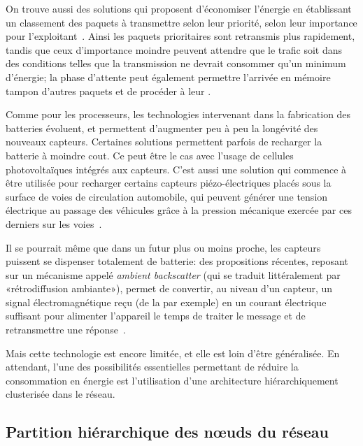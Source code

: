 On trouve aussi des solutions qui proposent d'économiser l'énergie en établissant un classement des paquets à transmettre selon leur priorité, \cad selon leur importance pour l'exploitant~\cite{SAS14}.
Ainsi les paquets prioritaires sont retransmis plus rapidement, tandis que ceux d'importance moindre peuvent attendre que le trafic soit dans des conditions telles que la transmission ne devrait consommer qu'un minimum d'énergie; la phase d'attente peut également permettre l'arrivée en mémoire tampon d'autres paquets et de procéder à leur .

Comme pour les processeurs, les technologies intervenant dans la fabrication des batteries évoluent, et permettent d'augmenter peu à peu la longévité des nouveaux capteurs.
Certaines solutions permettent parfois de recharger la batterie à moindre cout.
Ce peut être le cas avec l'usage de cellules photovoltaïques intégrés aux capteurs.
C'est aussi une solution qui commence à être utilisée pour recharger certains capteurs piézo-électriques placés sous la surface de voies de circulation automobile, qui peuvent générer une tension électrique au passage des véhicules grâce à la pression mécanique exercée par ces derniers sur les voies~\cite{sti}.

Il se pourrait même que dans un futur plus ou moins proche, les capteurs puissent se dispenser totalement de batterie: des propositions récentes, reposant sur un mécanisme appelé \textit{ambient backscatter} (qui se traduit littéralement par «rétrodiffusion ambiante»), permet de convertir, au niveau d'un capteur, un signal électromagnétique reçu (de la \sdb par exemple) en un courant électrique suffisant pour alimenter l'appareil le temps de traiter le message et de retransmettre une réponse~\cite{LPTGWS13}.

Mais cette technologie est encore limitée, et elle est loin d'être généralisée.
En attendant, l'une des possibilités essentielles permettant de réduire la consommation en énergie est l'utilisation d'une architecture  hiérarchiquement clusterisée dans le réseau.

    \subsection{Partition hiérarchique des nœuds du réseau}\label{st:subsec:partition}
